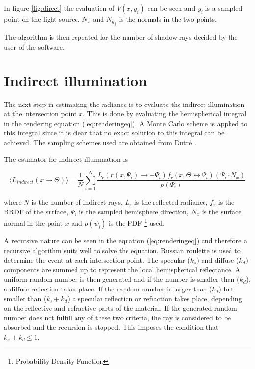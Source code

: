 \documentclass[a4paper]{report}
\begin{document}
In figure \ref{fig:direct} the evaluation of \(V(x,y_i)\) can be seen
and \(y_i\) is a sampled point on the light source. \(N_x\) and
\({N_y}_i\) is the normals in the two points.

The algorithm is then repeated for the number of shadow rays decided
by the user of the software.

\section{Indirect illumination}

The next step in estimating the radiance is to evaluate the indirect
illumination at the intersection point \(x\). This is done by
evaluating the hemispherical integral in the rendering equation
(\ref{eq:renderingeq}). A Monte Carlo scheme is applied to this
integral since it is clear that no exact solution to this integral can
be achieved. The sampling schemes used are obtained from Dutré \cite{globalcomp}. 

The estimator for indirect illumination is

\begin{equation}
  \langle L_{indirect}(x \to \Theta) \rangle = \frac{1}{N}\sum^N_{i=1}
  \frac{L_r(r(x,\Psi_i) \to -\Psi_i)f_r(x,\Theta \leftrightarrow
    \Psi_i)(\Psi_i \cdot N_x)}{p(\Psi_i)}
  \label{eq:indirest}
\end{equation}

where \(N\) is the number of indirect rays, \(L_r\) is the reflected
radiance, \(f_r\) is the BRDF of the surface, \(\Psi_i\) is the
sampled hemisphere direction, \(N_x\) is the surface normal in the
point \(x\) and \(p(\psi_i)\) is the PDF \footnote{Probability Density
Function} used.

A recursive nature can be seen in the equation (\ref{eq:renderingeq})
and therefore a recursive algorithm suits well to solve the
equation. Russian roulette is used to determine the event at each
intersection point. The specular (\(k_s\)) and diffuse (\(k_d\)) components are summed up
to represent the local hemispherical reflectance. A uniform random
number is then generated and if the number is smaller than (\(k_d\)), a
diffuse reflection takes place. If the random number is larger than
 (\(k_d\)) but smaller than (\(k_s+k_d\)) a specular reflection or
 refraction takes place, depending on the reflective and refractive
 parts of the material. If the generated random number does not
 fulfill any of these two criteria, the ray is considered to be
 absorbed and the recursion is stopped. This imposes the condition
 that \(k_s+k_d \leq 1\). 
\end{document}

